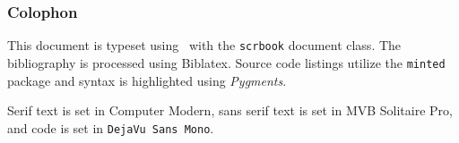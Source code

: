 
\thispagestyle{empty}
\vspace*{\fill}

\begin{minipage}{0.7\textwidth}
\subsubsection*{Colophon}
\raggedright\small
This document is typeset using \XeLaTeX\ with the \texttt{scrbook} document class. The bibliography is processed using Biblatex. Source code listings utilize the \texttt{minted} package and syntax is highlighted using \emph{Pygments}.
\vspace{0.5em}

Serif text is set in Computer Modern, sans serif text is set in \textsf{MVB Solitaire Pro}, and code is set in \texttt{\footnotesize DejaVu Sans Mono}. 

\end{minipage}